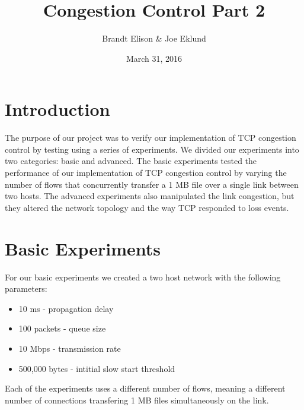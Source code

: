 \documentclass[11pt]{article}
\begin{document}
\lstset{
  language=Python,
  basicstyle=\small,          %
  keywordstyle=\bfseries,
  identifierstyle=,           %
  commentstyle=,              %
  stringstyle=\ttfamily,      %
  showstringspaces=false,     %
  numbers=left,
  numberstyle=\tiny,
  numbersep=5pt,
  frame=tb
}

\title{Congestion Control Part 2}

\author{Brandt Elison & Joe Eklund}

\date{March 31, 2016}

\maketitle

\section{Introduction}

The purpose of our project was to verify our implementation of TCP congestion control by testing using a series of experiments. We divided our experiments into two categories: basic and advanced. The basic experiments tested the performance of our implementation of TCP congestion control by varying the number of flows that concurrently transfer a 1 MB file over a single link between two hosts. The advanced experiments also manipulated the link congestion, but they altered the network topology and the way TCP responded to loss events.

\section{Basic Experiments}

For our basic experiments we created a two host network with the following parameters:

\begin{itemize}
  \item 10 ms - propagation delay
  \item 100 packets - queue size
  \item 10 Mbps - transmission rate
  \item 500,000 bytes - intitial slow start threshold
\end{itemize}

Each of the experiments uses a different number of flows, meaning a different number of connections transfering 1 MB files simultaneously on the link.
\end{document}
